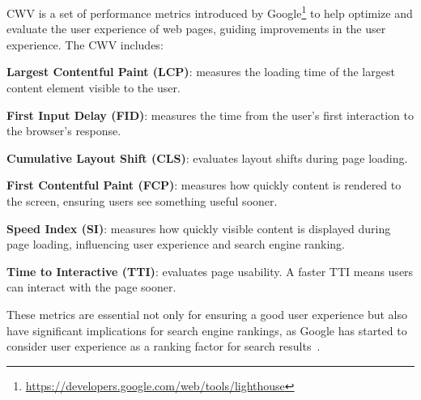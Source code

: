 CWV is a set of performance metrics introduced by Google\footnote{\url{https://developers.google.com/web/tools/lighthouse}} to help optimize and evaluate the user experience of web pages, guiding improvements in the user experience. The CWV includes:

\textbf{Largest Contentful Paint (LCP)}: measures the loading time of the largest content element visible to the user.

\textbf{First Input Delay (FID)}: measures the time from the user's first interaction to the browser's response.

\textbf{Cumulative Layout Shift (CLS)}: evaluates layout shifts during page loading.

\textbf{First Contentful Paint (FCP)}: measures how quickly content is rendered to the screen, ensuring users see something useful sooner.

\textbf{Speed Index (SI)}: measures how quickly visible content is displayed during page loading, influencing user experience and search engine ranking.

\textbf{Time to Interactive (TTI)}: evaluates page usability. A faster TTI means users can interact with the page sooner.

These metrics are essential not only for ensuring a good user experience but also have significant implications for search engine rankings, as Google has started to consider user experience as a ranking factor for search results~\cite{pageExp:2022}.

